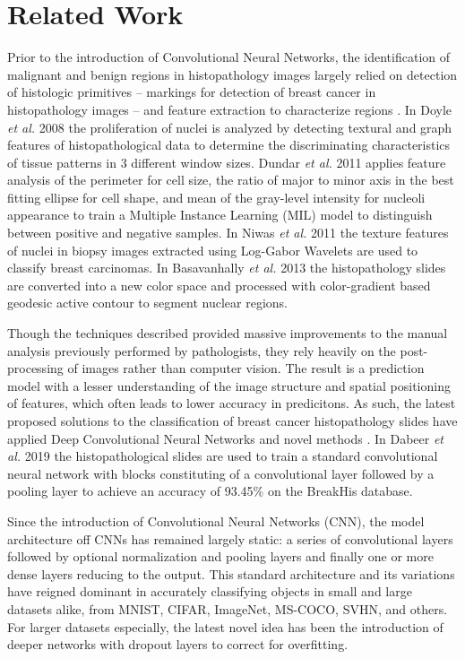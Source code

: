 \documentclass[conference]{IEEEtran}
\begin{document}
\section{Related Work}
Prior to the introduction of Convolutional Neural Networks, the identification of malignant and benign regions in histopathology images largely relied on detection of histologic primitives -- markings for detection of breast cancer in histopathology images -- and feature extraction to characterize regions \cite{Doyle2008,Dundar2011,Niwas2011,Basavanhally2013}. In Doyle \emph{et al.} 2008 \cite{Doyle2008} the proliferation of nuclei is analyzed by detecting textural and graph features of histopathological data to determine the discriminating characteristics of tissue patterns in 3 different window sizes. Dundar \emph{et al.} 2011 \cite{Dundar2011} applies feature analysis of the perimeter for cell size, the ratio of major to minor axis in the best fitting ellipse for cell shape, and mean of the gray-level intensity for nucleoli appearance to train a Multiple Instance Learning (MIL) model to distinguish between positive and negative samples. In Niwas \emph{et al.} 2011 \cite{Niwas2011} the texture features of nuclei in biopsy images extracted using Log-Gabor Wavelets are used to classify breast carcinomas. In Basavanhally \emph{et al.} 2013 \cite{Basavanhally2013} the histopathology slides are converted into a new color space and processed with color-gradient based geodesic active contour to segment nuclear regions.

Though the techniques described provided massive improvements to the manual analysis previously performed by pathologists, they rely heavily on the post-processing of images rather than computer vision. The result is a prediction model with a lesser understanding of the image structure and spatial positioning of features, which often leads to lower accuracy in predicitons. As such, the latest proposed solutions to the classification of breast cancer histopathology slides have applied Deep Convolutional Neural Networks and novel methods \cite{Dabeer2019,Mahmood2020,Gour2020,Wahab2020,Zainudin2020}. In Dabeer \emph{et al.} 2019 \cite{Dabeer2019} the histopathological slides are used to train a standard convolutional neural network with blocks constituting of a convolutional layer followed by a pooling layer to achieve an accuracy of 93.45\% on the BreakHis database.

Since the introduction of Convolutional Neural Networks (CNN), the model architecture off CNNs has remained largely static: a series of convolutional layers followed by optional normalization and pooling layers and finally one or more dense layers reducing to the output. This standard architecture and its variations have reigned dominant in accurately classifying objects in small and large datasets alike, from MNIST, CIFAR, ImageNet, MS-COCO, SVHN, and others. For larger datasets especially, the latest novel idea has been the introduction of deeper networks with dropout layers to correct for overfitting.
\end{document}

